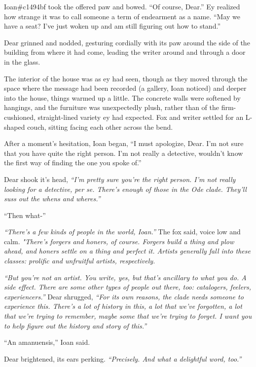Ioan\#c1494bf took the offered paw and bowed. ``Of course, Dear.'' Ey realized how strange it was to call someone a term of endearment as a name. ``May we have a seat? I've just woken up and am still figuring out how to stand.''

Dear grinned and nodded, gesturing cordially with its paw around the side of the building from where it had come, leading the writer around and through a door in the glass.

The interior of the house was as ey had seen, though as they moved through the space where the message had been recorded (a gallery, Ioan noticed) and deeper into the house, things warmed up a little. The concrete walls were softened by hangings, and the furniture was unexpectedly plush, rather than of the firm-cushioned, straight-lined variety ey had expected. Fox and writer settled for an L-shaped couch, sitting facing each other across the bend.

After a moment's hesitation, Ioan began, ``I must apologize, Dear. I'm not sure that you have quite the right person. I'm not really a detective, wouldn't know the first way of finding the one you spoke of.''

Dear shook it's head, \emph{``I'm pretty sure you're the right person. I'm not really looking for a detective, per se. There's enough of those in the Ode clade. They'll suss out the whens and wheres.''}

``Then what-''

\emph{``There's a few kinds of people in the world, Ioan.''} The fox said, voice low and calm. \emph{"There's forgers and honers, of course. Forgers build a thing and plow ahead, and honers settle on a thing and perfect it. Artists generally fall into these classes: prolific and unfruitful artists, respectively.}

\emph{``But you're not an artist. You write, yes, but that's ancillary to what you do. A side effect. There are some other types of people out there, too: catalogers, feelers, experiencers.''} Dear shrugged, \emph{``For its own reasons, the clade needs someone to experience this. There's a lot of history in this, a lot that we've forgotten, a lot that we're trying to remember, maybe some that we're trying to forget. I want you to help figure out the history and story of this.''}

``An amanuensis,'' Ioan said.

Dear brightened, its ears perking. \emph{``Precisely. And what a delightful word, too.''}

